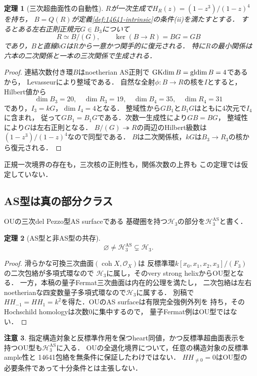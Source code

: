 \documentclass[11pt,a4paper]{ltjsarticle}
\newtheorem{theorem}{定理}[section]
\theoremstyle{definition}\newtheorem{definition}[theorem]{定義}
\newtheorem{remark}[theorem]{注意}
\newcommand{\OO}{\mathcal O}\newcommand{\cA}{\mathcal A}
\begin{document}
\begin{theorem}[三次超曲面性の自動性]\label{thm:14641-principal-recognition}
$R$が一次生成で$H_R(z)=(1-z^3)/(1-z)^4$を持ち，
$B=Q(R)$が定義\ref{def:14641-intrinsic}の条件(ii)を満たすとする．
するとある左右正則正規元$G\in B_3$について
\[
 R\simeq B/(G),\qquad \ker(B\to R)=BG=GB
\]
であり，$B$と直線$kG$は$R$から一意かつ関手的に復元される．
特に$R$の最小関係は六本の二次関係と一本の三次関係で生成される．
\end{theorem}
\begin{proof}
連結次数付き環$B$はnoetherian AS正則で
$\operatorname{GKdim}B=\operatorname{gldim} B=4$であるから，
Levasseur\cite[Theorem 6.2(ii)]{Levasseur}により整域である．
自然な全射$\phi:B\to R$の核を$I$とすると，Hilbert値から
\[
 \dim B_3=20,\quad\dim R_3=19,\quad
 \dim B_4=35,\quad\dim R_4=31
\]
であり，$I_3=kG$，$\dim I_4=4$となる．
整域性から$GB_1$と$B_1G$はともに4次元で$I_4$に含まれ，
従って$GB_1=B_1G$である．次数一生成性により$GB=BG$，
整域性により$G$は左右正則となる．
$B/(G)\twoheadrightarrow R$の両辺のHilbert級数は
$(1-z^3)/(1-z)^4$なので同型である．
$B$は二次関係核，$kG$は$B_3\to R_3$の核から復元される．
\end{proof}
正規一次境界の存在も，三次核の正則性も，関係次数の上界も
この定理では仮定していない．

\subsection{AS型は真の部分クラス}
OU\cite[Definition 1.1]{OUAS}の三次del Pezzo型AS surfaceである
基礎圏を持つ$\mathcal H_3$の部分を$\mathcal H_3^{\mathrm{AS}}$と書く．
\begin{theorem}[AS型と非AS型の共存]\label{thm:strict-AS-inclusion}
\[
 \varnothing\ne\mathcal H_3^{\mathrm{AS}}\subsetneq\mathcal H_3.
\]
\end{theorem}
\begin{proof}
滑らかな可換三次曲面$(\operatorname{coh}X,\OO_X)$は
反標準環$k[x_0,x_1,x_2,x_3]/(F_3)$の二次包絡が多項式環なので
$\mathcal H_3$に属し，そのvery strong helixからOU型となる．
一方，本稿の量子Fermat三次曲面は内在的公理を満たし，
二次包絡は左右noetherianな四変数量子多項式環なので$\mathcal H_3$に属する．
別稿\cite[Theorem 3.1]{FermatOU}で
$HH_{-1}=HH_1=k^2$を得た．OUのAS surfaceは有限完全強例外列を
持ち，そのHochschild homologyは次数0に集中するので，
量子Fermat例はOU型ではない．
\end{proof}
\begin{remark}
指定構造対象と反標準作用を保つheart同値，かつ反標準超曲面表示を
持つOU型も$\mathcal H_3^{\mathrm{AS}}$に入る．
OUの全退化境界について，任意の構造対象の反標準ample性と
14641包絡を無条件に保証したわけではない．
$HH_{\ne0}=0$はOU型の必要条件であって十分条件とは主張しない．
\end{remark}
\end{document}
